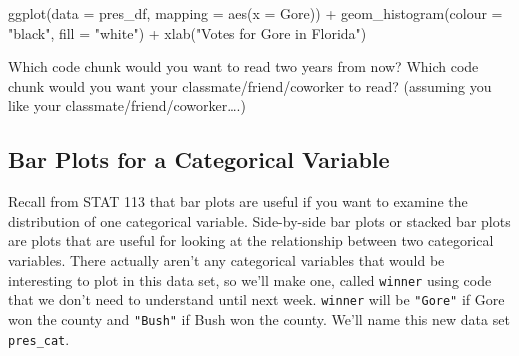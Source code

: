 \documentclass[
]{book}
\newenvironment{Shaded}{\begin{snugshade}}{\end{snugshade}}
\newcommand{\AttributeTok}[1]{\textcolor[rgb]{0.77,0.63,0.00}{#1}}
\newcommand{\FunctionTok}[1]{\textcolor[rgb]{0.00,0.00,0.00}{#1}}
\newcommand{\NormalTok}[1]{#1}
\newcommand{\SpecialCharTok}[1]{\textcolor[rgb]{0.00,0.00,0.00}{#1}}
\newcommand{\StringTok}[1]{\textcolor[rgb]{0.31,0.60,0.02}{#1}}
\begin{document}
\begin{Shaded}
\begin{Highlighting}[]
\FunctionTok{ggplot}\NormalTok{(}\AttributeTok{data =}\NormalTok{ pres\_df, }\AttributeTok{mapping =} \FunctionTok{aes}\NormalTok{(}\AttributeTok{x =}\NormalTok{ Gore)) }\SpecialCharTok{+}
  \FunctionTok{geom\_histogram}\NormalTok{(}\AttributeTok{colour =} \StringTok{"black"}\NormalTok{, }\AttributeTok{fill =} \StringTok{"white"}\NormalTok{) }\SpecialCharTok{+}
  \FunctionTok{xlab}\NormalTok{(}\StringTok{"Votes for Gore in Florida"}\NormalTok{)}
\end{Highlighting}
\end{Shaded}

Which code chunk would you want to read two years from now? Which code chunk would you want your classmate/friend/coworker to read? (assuming you like your classmate/friend/coworker\ldots.)

\hypertarget{bar-plots-for-a-categorical-variable}{%
\subsection{Bar Plots for a Categorical Variable}\label{bar-plots-for-a-categorical-variable}}

Recall from STAT 113 that bar plots are useful if you want to examine the distribution of one categorical variable. Side-by-side bar plots or stacked bar plots are plots that are useful for looking at the relationship between two categorical variables. There actually aren't any categorical variables that would be interesting to plot in this data set, so we'll make one, called \texttt{winner} using code that we don't need to understand until next week. \texttt{winner} will be \texttt{"Gore"} if Gore won the county and \texttt{"Bush"} if Bush won the county. We'll name this new data set \texttt{pres\_cat}.
\end{document}
